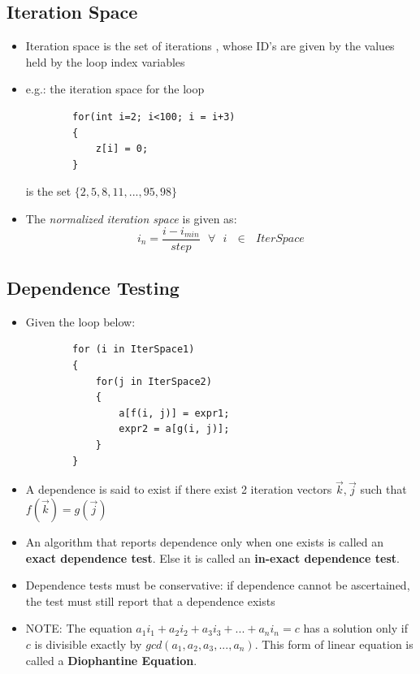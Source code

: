 \documentclass{article}
\begin{document}
\subsection{Iteration Space}
\begin{itemize}
    \item Iteration space is the set of iterations , whose ID’s are given by the values held by the loop index variables
    
    \item e.g.: the iteration space for the loop
    
    \begin{verbatim}
        for(int i=2; i<100; i = i+3)
        {
            z[i] = 0;
        }
    \end{verbatim}
    
    is the set $\{2, 5, 8, 11, ..., 95, 98\}$
    
    \item The \textit{normalized iteration space} is given as:
    \begin{equation*}
        i_n = \frac{i-i_{min}}{step}\text{ }\forall\text{ }i\text{ }\in\text{ }IterSpace
    \end{equation*}
\end{itemize}

\subsection{Dependence Testing}
\begin{itemize}
    \item Given the loop below:
    \begin{verbatim}
        for (i in IterSpace1)
        {
            for(j in IterSpace2)
            {
                a[f(i, j)] = expr1;
                expr2 = a[g(i, j)];
            }
        }
    \end{verbatim}
    
    \item A dependence is said to exist if there exist 2 iteration vectors $\overrightarrow{k}, \overrightarrow{j}$ such that $f(\overrightarrow{k}) = g(\overrightarrow{j})$
    
    \item An algorithm that reports dependence only when one exists is called an \textbf{exact dependence test}. Else it is called an \textbf{in-exact dependence test}.
    
    \item Dependence tests must be conservative: if dependence cannot be ascertained, the test must still report that a dependence exists
    
    \item NOTE: The equation $a_1 i_1 + a_2 i_2 + a_3 i_3 + ... + a_n i_n = c$ has a solution only if $c$ is divisible exactly by $gcd(a_1, a_2, a_3, ..., a_n)$. This form of linear equation is called a \textbf{Diophantine Equation}.
\end{itemize}
\end{document}
